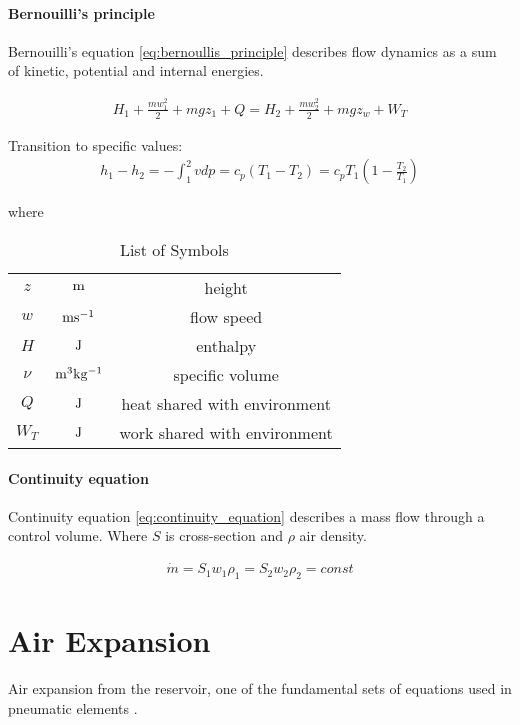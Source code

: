 \paragraph{Bernouilli's principle}
Bernouilli's equation \ref{eq:bernoullis_principle} describes flow
dynamics as a sum of kinetic, potential and internal energies.

\begin{align}
    H_1 + \frac{mw_1^2}{2} + mgz_1 + Q = H_2 + \frac{mw_2^2}{2} + mgz_w +
    W_T
    \label{eq:bernoullis_principle}
\end{align}

Transition to specific values:
\begin{align}
    h_1- h_2 = -\int_1^2 v dp = c_p(T_1-T_2) = 
    c_p T_1\left(1-\frac{T_2}{T_1}\right)
    \label{eq:etalpi_sub}
\end{align}

where 

\begin{table}[h]
    \centering
    \begin{tabular}{|c|c|c|}
        \hline
        $z$    &$\rm m$              & height \\
    $w$        &$\rm ms^{-1}$        & flow speed \\
    $H$        &$\rm J$              & enthalpy \\
    $\nu$      &$\rm m^3kg^{-1}$     & specific volume \\
    $Q$        &$\rm J$              & heat shared with
                                        environment \\
    $W_T$      &$\rm J$              & work shared with environment \\
        \hline
    \end{tabular}
    \caption{List of Symbols}
    \label{tab:}
\end{table}


\paragraph{Continuity equation}
Continuity equation \ref{eq:continuity_equation} describes a mass flow
through a control volume. Where $S$ is cross-section and $\rho$ air
density.

\begin{align}
    \dot{m} = S_1 w_1 \rho_1 = S_2 w_2 \rho_2 = const
    \label{eq:continuity_equation}
\end{align}


\section{Air Expansion}\label{sec:air_expansion}
Air expansion from the reservoir, one of the fundamental sets of equations
used in pneumatic elements \cite{isermann_mech}. 

